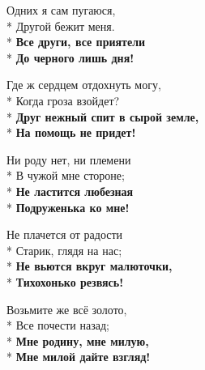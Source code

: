 \medskip

\begin{minipage}{\linewidth}
Одних я сам пугаюся,\\*
Другой бежит меня.\\*
\textbf{Все други, все приятели}\\*
\textbf{До черного лишь дня!}\\
\end{minipage}\par\medskip\nobreak

\medskip

\begin{minipage}{\linewidth}
Где ж сердцем отдохнуть могу,\\*
Когда гроза взойдет?\\*
\textbf{Друг нежный спит в сырой земле,}\\*
\textbf{На помощь не придет!}\\
\end{minipage}\par\medskip\nobreak

\medskip

\begin{minipage}{\linewidth}
Ни роду нет, ни племени\\*
В чужой мне стороне;\\*
\textbf{Не ластится любезная}\\*
\textbf{Подруженька ко мне!}\\
\end{minipage}\par\medskip\nobreak

\medskip

\begin{minipage}{\linewidth}
Не плачется от радости\\*
Старик, глядя на нас;\\*
\textbf{Не вьются вкруг малюточки,}\\*
\textbf{Тихохонько резвясь!}\\
\end{minipage}\par\medskip\nobreak

\medskip

\begin{minipage}{\linewidth}
Возьмите же всё золото,\\*
Все почести назад;\\*
\textbf{Мне родину, мне милую,}\\*
\textbf{Мне милой дайте взгляд!}\\
\end{minipage}

